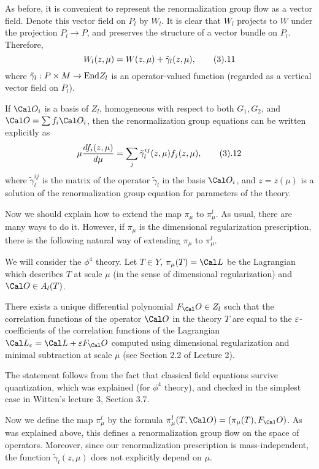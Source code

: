 As before, it is convenient to represent the renormalization group flow 
as a vector field. Denote this vector field on $P_l$ by $W_l$. 
It is clear that $W_l$ projects to $W$ under the projection $P_l\to P$, 
and preserves the structure of a vector bundle on $P_l$.
Therefore, 
$$
W_l(z,\mu)=W(z,\mu)+\tilde\gamma_l(z,\mu),\tag 3.11
$$
where $\tilde\gamma_l: P\times M\to \text{End} Z_l$ is an operator-valued function
(regarded as a vertical vector field on $P_l$). 

If $\O_i$ is a basis of $Z_l$, homogeneous with respect to both $G_1,G_2$,
and $\O=\sum f_i\O_i$,
then the renormalization group equations
can be written explicitly as
$$
\mu\frac{d f_i(z,\mu)}{d \mu}=\sum_j\tilde\gamma_l^{ij}(z,\mu)f_j(z,\mu),
\tag 3.12
$$
where $\tilde\gamma_l^{ij}$ is the matrix of the operator $\tilde\gamma_l$ in the basis 
$\O_i$, and $z=z(\mu)$ is a solution of the renormalization 
group equation for parameters of the theory.   

Now we should explain how to extend the map $\pi_\mu$ to $\pi_\mu^l$. 
As usual, there are many ways to do it. However, if $\pi_\mu$ is 
the dimensional regularization prescription, there is the following 
natural way of extending $\pi_\mu$ to $\pi_\mu^l$.

We will consider the $\phi^4$ theory. 
Let $T\in Y$, $\pi_\mu(T)=\Cal L$ be the Lagrangian which
describes $T$ at scale $\mu$ (in the sense of dimensional 
regularization) and  
$\O\in A_l(T)$. 

 There exists a unique 
differential polynomial  
$F_\O\in Z_l$ such that the correlation functions of the operator 
$\O$ in the theory $T$ are equal to the $\varepsilon$-coefficients of the correlation 
functions of the Lagrangian $\Cal L_\e=\Cal L+\e F_\O$ computed using
dimensional regularization and minimal subtraction at scale $\mu$ 
(see Section 2.2 of Lecture 2).
\endproclaim

 The statement follows from the fact that
classical field equations survive quantization, which was explained 
(for $\phi^4$ theory),
and checked in the simplest case in Witten's lecture 3, Section 3.7.
\enddemo
 
Now we define the map $\pi_\mu^l$ by the formula $\pi_\mu^l(T,\O)=
(\pi_\mu(T),F_\O)$. As was explained above, this defines a renormalization
group flow on the space of operators. Moreover, since our renormalization 
prescription is mass-independent, the function $\tilde\gamma_l(z,\mu)$ does not
explicitly depend on $\mu$.

